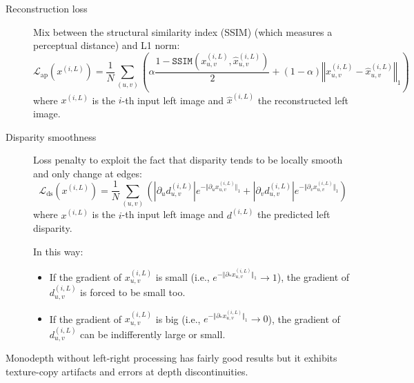 \begin{description}
\begin{description}
                \begin{description}
                    \item[Reconstruction loss] 
                        Mix between the structural similarity index (SSIM) (which measures a perceptual distance) and L1 norm:
                        \[ \mathcal{L}_{\text{ap}}(x^{(i, L)}) = \frac{1}{N} \sum_{(u, v)} \left( \alpha \frac{1-\texttt{SSIM}(x_{u, v}^{(i, L)}, \hat{x}_{u, v}^{(i, L)})}{2} + (1-\alpha) \left\Vert x_{u, v}^{(i, L)} - \hat{x}_{u, v}^{(i, L)} \right\Vert_1 \right) \]
                        where $x^{(i, L)}$ is the $i$-th input left image and $\hat{x}^{(i, L)}$ the reconstructed left image.

                    \item[Disparity smoothness] 
                        Loss penalty to exploit the fact that disparity tends to be locally smooth and only change at edges:
                        \[ \mathcal{L}_{\text{ds}}(x^{(i, L)}) = \frac{1}{N} \sum_{(u, v)} \left(\left\vert \partial_u d_{u, v}^{(i, L)} \right\vert e^{- \Vert \partial_u x_{u, v}^{(i, L)} \Vert_1} + \left\vert \partial_v d_{u, v}^{(i, L)} \right\vert e^{- \Vert \partial_v x_{u, v}^{(i, L)} \Vert_1} \right) \]
                        where $x^{(i, L)}$ is the $i$-th input left image and $d^{(i, L)}$ the predicted left disparity.

                        In this way:
                        \begin{itemize}
                            \item If the gradient of $x_{u, v}^{(i, L)}$ is small (i.e., $e^{- \Vert \partial_* x_{u, v}^{(i, L)} \Vert_1} \rightarrow 1$), the gradient of $d_{u, v}^{(i, L)}$ is forced to be small too.
                            \item If the gradient of $x_{u, v}^{(i, L)}$ is big (i.e., $e^{- \Vert \partial_* x_{u, v}^{(i, L)} \Vert_1} \rightarrow 0$), the gradient of $d_{u, v}^{(i, L)}$ can be indifferently large or small.
                        \end{itemize}
                \end{description}
        \end{description}

        \begin{remark}
            Monodepth without left-right processing has fairly good results but it exhibits texture-copy artifacts and errors at depth discontinuities.


\end{remark}
\end{description}
